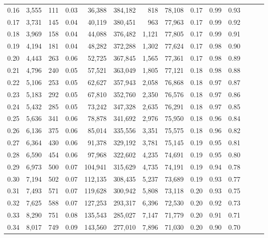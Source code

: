 \begin{tabular}{rrrrrrrrrrrrrr}
0.16 &  3,555 &    111 &  0.03 &   36,388 &  384,182 &     818 &  78,108 &  0.17 &  0.99 &      0.93 \\
0.17 &  3,731 &    145 &  0.04 &   40,119 &  380,451 &     963 &  77,963 &  0.17 &  0.99 &      0.92 \\
0.18 &  3,969 &    158 &  0.04 &   44,088 &  376,482 &   1,121 &  77,805 &  0.17 &  0.99 &      0.91 \\
0.19 &  4,194 &    181 &  0.04 &   48,282 &  372,288 &   1,302 &  77,624 &  0.17 &  0.98 &      0.90 \\
0.20 &  4,443 &    263 &  0.06 &   52,725 &  367,845 &   1,565 &  77,361 &  0.17 &  0.98 &      0.89 \\
0.21 &  4,796 &    240 &  0.05 &   57,521 &  363,049 &   1,805 &  77,121 &  0.18 &  0.98 &      0.88 \\
0.22 &  5,106 &    253 &  0.05 &   62,627 &  357,943 &   2,058 &  76,868 &  0.18 &  0.97 &      0.87 \\
0.23 &  5,183 &    292 &  0.05 &   67,810 &  352,760 &   2,350 &  76,576 &  0.18 &  0.97 &      0.86 \\
0.24 &  5,432 &    285 &  0.05 &   73,242 &  347,328 &   2,635 &  76,291 &  0.18 &  0.97 &      0.85 \\
0.25 &  5,636 &    341 &  0.06 &   78,878 &  341,692 &   2,976 &  75,950 &  0.18 &  0.96 &      0.84 \\
0.26 &  6,136 &    375 &  0.06 &   85,014 &  335,556 &   3,351 &  75,575 &  0.18 &  0.96 &      0.82 \\
0.27 &  6,364 &    430 &  0.06 &   91,378 &  329,192 &   3,781 &  75,145 &  0.19 &  0.95 &      0.81 \\
0.28 &  6,590 &    454 &  0.06 &   97,968 &  322,602 &   4,235 &  74,691 &  0.19 &  0.95 &      0.80 \\
0.29 &  6,973 &    500 &  0.07 &  104,941 &  315,629 &   4,735 &  74,191 &  0.19 &  0.94 &      0.78 \\
0.30 &  7,194 &    502 &  0.07 &  112,135 &  308,435 &   5,237 &  73,689 &  0.19 &  0.93 &      0.77 \\
0.31 &  7,493 &    571 &  0.07 &  119,628 &  300,942 &   5,808 &  73,118 &  0.20 &  0.93 &      0.75 \\
0.32 &  7,625 &    588 &  0.07 &  127,253 &  293,317 &   6,396 &  72,530 &  0.20 &  0.92 &      0.73 \\
0.33 &  8,290 &    751 &  0.08 &  135,543 &  285,027 &   7,147 &  71,779 &  0.20 &  0.91 &      0.71 \\
0.34 &  8,017 &    749 &  0.09 &  143,560 &  277,010 &   7,896 &  71,030 &  0.20 &  0.90 &      0.70 \\

\end{tabular}
